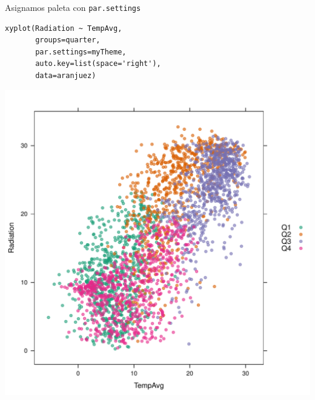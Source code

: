 \documentclass[xcolor={usenames,svgnames,dvipsnames}]{beamer}
\begin{document}
\begin{frame}[fragile,label=sec-6-2-11]{Asignamos paleta con \texttt{par.settings}}
 \lstset{language=R,label= ,caption= ,numbers=none}
\begin{lstlisting}
xyplot(Radiation ~ TempAvg,
       groups=quarter,
       par.settings=myTheme,
       auto.key=list(space='right'),
       data=aranjuez)
\end{lstlisting}
\end{frame}

\begin{frame}[label=sec-6-2-12]{}
\includegraphics[width=.9\linewidth]{figs/brewer.pdf}
\end{frame}
\end{document}
